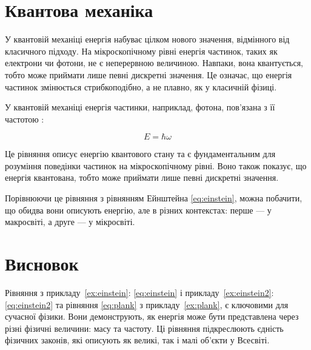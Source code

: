 \documentclass{article}
\numberwithin{ExampleCounter}{section}
\numberwithin{equation}{ExampleCounter}
\begin{document}
\section{Квантова механіка}


У квантовій механіці енергія набуває цілком нового значення, відмінного від класичного підходу. На
мікроскопічному рівні енергія частинок, таких як електрони чи фотони, не є неперервною величиною.
Навпаки, вона квантується, тобто може приймати лише певні дискретні значення. Це означає, що енергія
частинок змінюється стрибкоподібно, а не плавно, як у класичній фізиці.

\begin{Example}\label{ex:plank}
	У квантовій механіці енергія частинки, наприклад, фотона, пов'язана з її частотою :

	\begin{equation}\label{eq:plank}
		E = \hbar\omega
	\end{equation}

	Це рівняння описує енергію квантового стану та є фундаментальним для розуміння поведінки
	частинок на мікроскопічному рівні. Воно також показує, що енергія квантована, тобто може
	приймати лише певні дискретні значення.

	Порівнюючи це рівняння з рівнянням Ейнштейна \eqref{eq:einstein}, можна побачити, що обидва
	вони описують енергію, але в різних контекстах: перше — у макросвіті, а друге — у мікросвіті.
\end{Example}

\section{Висновок}

Рівняння з прикладу~\ref{ex:einstein}: \eqref{eq:einstein} і прикладу~\ref{ex:einstein2}:
\eqref{eq:einstein2} та рівняння \ref{eq:plank} з
прикладу~\ref{ex:plank}, є ключовими для сучасної фізики. Вони
демонструють, як енергія може бути представлена через різні фізичні величини: масу та частоту.
Ці рівняння підкреслюють єдність фізичних законів, які описують як великі, так і малі об'єкти у
Всесвіті.
\end{document}
